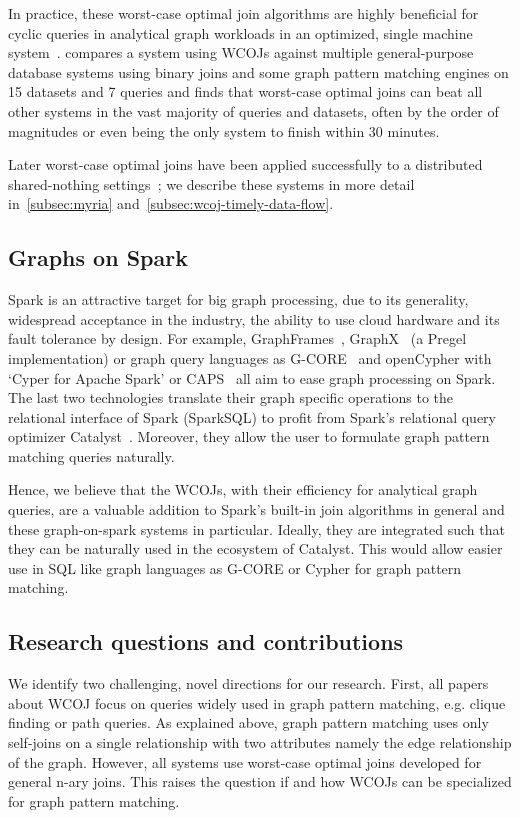 In practice, these worst-case optimal join algorithms are highly beneficial for cyclic queries in analytical graph
workloads in an optimized, single machine system~\cite{lftj,olddog}.
\cite{olddog} compares a system using \textsc{WCOJ}s against multiple general-purpose database
systems using binary joins and some graph pattern matching engines on 15 datasets and 7 queries and
finds that worst-case optimal joins can beat all other systems in the vast majority of queries
and datasets, often by the order of magnitudes or even being the only system to finish within 30 minutes.

Later worst-case optimal joins have been applied successfully to a distributed shared-nothing settings~\cite{myria-detailed,
ammar2018distributed};
we describe these systems in more detail in~\cref{subsec:myria} and~\ref{subsec:wcoj-timely-data-flow}.

\subsection{Graphs on Spark}\label{subsec:graphs-on-spark}
Spark is an attractive target for big graph processing, due to its generality, widespread acceptance in the industry, the ability to use
cloud hardware and its fault tolerance by design.
For example, GraphFrames~\cite{graphframe}, GraphX~\cite{graphx} (a Pregel~\cite{pregel} implementation) or graph query languages
as \mbox{G-CORE}~\cite{gcore} and \mbox{openCypher} with `Cyper for Apache Spark' or \textsc{CAPS}~\cite{caps} all aim to ease graph
processing on Spark.
The last two technologies translate their graph specific operations to the relational interface of Spark (SparkSQL)
to profit from Spark's relational query optimizer Catalyst~\cite{spark-sql}.
Moreover, they allow the user to formulate graph pattern matching queries naturally.

Hence, we believe that the \textsc{WCOJ}s, with their efficiency for analytical graph queries, are a valuable addition to Spark's
built-in join algorithms in general and these graph-on-spark systems in particular.
Ideally, they are integrated such that they can be naturally used in the ecosystem of Catalyst.
This would allow easier use in SQL like graph languages as \textsc{G-CORE} or Cypher for graph pattern matching.

\subsection{Research questions and contributions}\label{subsec:research-questions-and-contributions}
We identify two challenging, novel directions for our research.
First, all papers about \textsc{WCOJ} focus on queries widely used in graph pattern matching, e.g. clique finding or path queries.
As explained above, graph pattern matching uses only self-joins on a single relationship with two attributes
namely the edge relationship of the graph.
However, all systems use worst-case optimal joins developed for general n-ary joins.
This raises the question if and how \textsc{WCOJ}s can be specialized for graph pattern matching.

